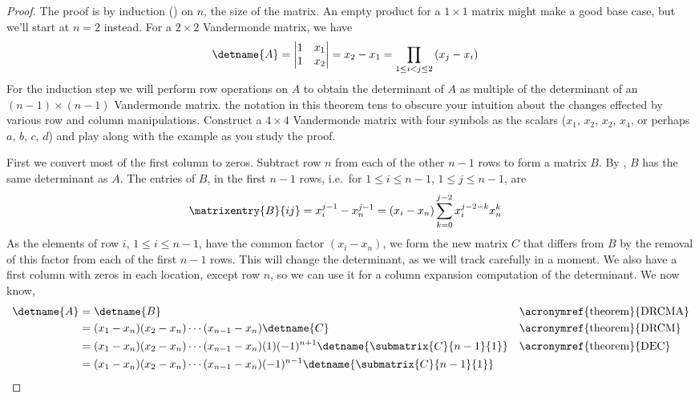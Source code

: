 %
\begin{proof}
The proof is by induction  () on $n$, the size of the matrix. An empty product for a $1\times 1$ matrix might make a good base case, but we'll start at $n=2$ instead.  For a $2\times 2$ Vandermonde matrix, we have
%
\begin{align*}
\detname{A}
&=
\begin{vmatrix}
1&x_1\\1&x_2
\end{vmatrix}
=x_2-x_1
=\prod_{1\leq i<j\leq 2}\left(x_j-x_i\right)
\end{align*}
%
For the induction step we will perform row operations on $A$ to obtain the determinant of $A$ as multiple of the determinant of an $(n-1)\times(n-1)$ Vandermonde matrix.  the notation in this theorem tens to obscure your intuition about the changes effected by various row and column manipulations.  Construct a $4\times 4$ Vandermonde matrix with four symbols as the scalars ($x_1$, $x_2$, $x_2$, $x_4$, or perhaps $a$, $b$, $c$, $d$) and play along with the example as you study the proof.\par
%
First we convert most of the first column to zeros.  Subtract row $n$ from each of the other $n-1$ rows to form a matrix $B$.  By , $B$ has the same determinant as $A$.  The entries of $B$, in the first $n-1$ rows, i.e.\ for $1\leq i\leq n-1$, $1\leq j\leq n-1$, are
%
\begin{align*}
\matrixentry{B}{ij}
&=x_{i}^{j-1}-x_{n}^{j-1}
=\left(x_i-x_n\right)\sum_{k=0}^{j-2} x_{i}^{j-2-k}x_{n}^{k}
\end{align*}
%
As the elements of row $i$, $1\leq i\leq n-1$, have the common factor $\left(x_i-x_n\right)$, we form the new matrix $C$ that differs from $B$ by the removal of this factor from each of the first $n-1$ rows.  This will change the determinant, as we will track carefully in a moment.  We also have a first column with zeros in each location, except row $n$, so we can use it for a column expansion computation of the determinant.  We now know,
%
\begin{align*}
\detname{A}
&=\detname{B}
&&\text{\acronymref{theorem}{DRCMA}}\\
%
&=(x_1-x_n)(x_2-x_n)\cdots(x_{n-1}-x_n)\detname{C}
&&\text{\acronymref{theorem}{DRCM}}\\
%
&=(x_1-x_n)(x_2-x_n)\cdots(x_{n-1}-x_n)(1)(-1)^{n+1}\detname{\submatrix{C}{n-1}{1}}
&&\text{\acronymref{theorem}{DEC}}\\
%
&=(x_1-x_n)(x_2-x_n)\cdots(x_{n-1}-x_n)(-1)^{n-1}\detname{\submatrix{C}{n-1}{1}}\\

\end{align*}
\end{proof}
